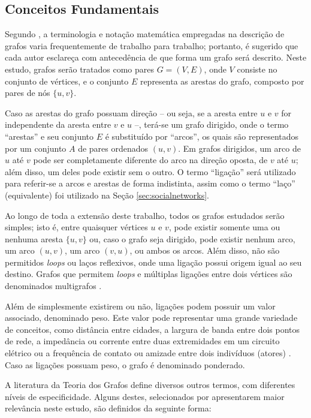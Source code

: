 \subsection{Conceitos Fundamentais} \label{sec:graphfoundation}

Segundo , a terminologia e notação matemática empregadas na descrição de grafos varia frequentemente de trabalho para trabalho; portanto, é sugerido que cada autor esclareça com antecedência de que forma um grafo será descrito. Neste estudo, grafos serão tratados como pares $G = (V, E)$, onde $V$ consiste no conjunto de vértices, e o conjunto $E$ representa as arestas do grafo, composto por pares de nós $\{u, v\}$.

Caso as arestas do grafo possuam direção -- ou seja, se a aresta entre $u$ e $v$ for independente da aresta entre $v$ e $u$ --, terá-se um grafo dirigido, onde o termo ``arestas'' e seu conjunto $E$ é substituído por ``arcos'', os quais são representados por um conjunto $A$ de pares ordenados $(u, v)$. Em grafos dirigidos, um arco de $u$ até $v$ pode ser completamente diferente do arco na direção oposta, de $v$ até $u$; além disso, um deles pode existir sem o outro. O termo ``ligação'' será utilizado para referir-se a arcos e arestas de forma indistinta, assim como o termo ``laço'' (equivalente) foi utilizado na Seção \ref{sec:socialnetworks}.

Ao longo de toda a extensão deste trabalho, todos os grafos estudados serão simples; isto é, entre quaisquer vértices $u$ e $v$, pode existir somente uma ou nenhuma aresta $\{u, v\}$ ou, caso o grafo seja dirigido, pode existir nenhum arco, um arco $(u, v)$, um arco $(v, u)$, ou ambos os arcos. Além disso, não são permitidos \textit{loops} ou laços reflexivos, onde uma ligação possui origem igual ao seu destino. Grafos que permitem \textit{loops} e múltiplas ligações entre dois vértices são denominados multigrafos \cite{Newman2010}.

Além de simplesmente existirem ou não, ligações podem possuir um valor associado, denominado peso. Este valor pode representar uma grande variedade de conceitos, como distância entre cidades, a largura de banda entre dois pontos de rede, a impedância ou corrente entre duas extremidades em um circuito elétrico ou a frequência de contato ou amizade entre dois indivíduos (atores) \cite{Newman2010}. Caso as ligações possuam peso, o grafo é denominado ponderado.

A literatura da Teoria dos Grafos define diversos outros termos, com diferentes níveis de especificidade. Alguns destes, selecionados por apresentarem maior relevância neste estudo, são definidos da seguinte forma:

